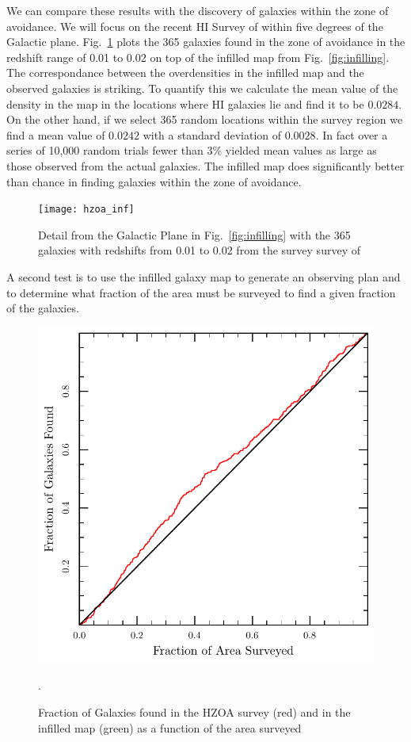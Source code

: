 \documentclass[useAMS,usenatbib]{mn2e}
\begin{document}
We can compare these results with the discovery of galaxies within the
zone of avoidance.  We will focus on the recent HI Survey of
\citet{2016AJ....151...52S} within five degrees of the Galactic plane.
Fig.~\ref{fig:hzoa_map} plots the 365 galaxies found in the zone of
avoidance in the redshift range of 0.01 to 0.02 on top of the infilled
map from Fig.~\ref{fig:infilling}.  The correspondance between the
overdensities in the infilled map and the observed galaxies is
striking.  To quantify this we calculate the mean value of the density
in the map in the locations where HI galaxies lie and find it to be
$0.0284$.  On the other hand, if we select 365 random locations within
the survey region we find a mean value of $0.0242$ with a standard
deviation of $0.0028$.  In fact over a series of 10,000 random trials
fewer than 3\% yielded mean values as large as those observed from the
actual galaxies.  The infilled map does significantly better than
chance in finding galaxies within the zone of avoidance.
\begin{figure}
  \texttt{[image: hzoa\_inf]}
  \caption{Detail from the Galactic Plane in Fig.~\ref{fig:infilling}
    with the 365 galaxies with redshifts from 0.01 to 0.02 from the survey
    survey of \citet{2016AJ....151...52S}}
  \label{fig:hzoa_map}
\end{figure}

A second test is to use the infilled galaxy map to generate an
observing plan and to determine what fraction of the area must be
surveyed to find a given fraction of the galaxies.
\begin{figure}
  \includegraphics[width=\columnwidth]{hzoa_cum}
  \caption{Fraction of Galaxies found in the HZOA survey (red) and in the infilled map (green) as a function of the area surveyed}.
  \label{fig:hzoa_cum}
\end{figure}
\end{document}
